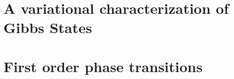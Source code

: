 

\section{A variational characterization of Gibbs States} 


\section{First order phase transitions}